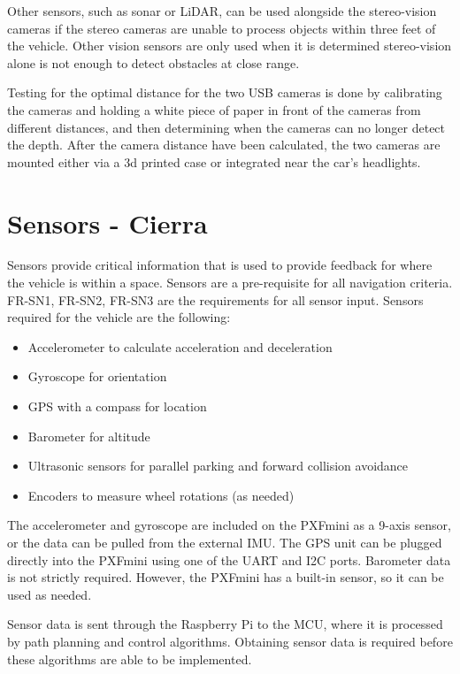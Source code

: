 \documentclass[compsoc,draftclsnofoot,onecolumn,10pt]{IEEEtran}
\begin{document}
Other sensors, such as sonar or LiDAR, can be used alongside the stereo-vision cameras if the stereo cameras are unable to process objects within three feet of the vehicle. Other vision sensors are only used when it is determined stereo-vision alone is not enough to detect obstacles at close range. \par
Testing for the optimal distance for the two USB cameras is done by calibrating the cameras and holding a white piece of paper in front of the cameras from different distances, and then determining when the cameras can no longer detect the depth. 
After the camera distance have been calculated, the two cameras are mounted either via a 3d printed case or integrated near the car's headlights. 

\section{Sensors - Cierra}
Sensors provide critical information that is used to provide feedback for where the vehicle is within a space. Sensors are a pre-requisite for all navigation criteria. FR-SN1, FR-SN2, FR-SN3 are the requirements for all sensor input. 
Sensors required for the vehicle are the following:
\begin{itemize}
\item Accelerometer to calculate acceleration and deceleration 
\item Gyroscope for orientation
\item GPS with a compass for location
\item Barometer for altitude 
\item Ultrasonic sensors for parallel parking and forward collision avoidance
\item Encoders to measure wheel rotations (as needed)
\end{itemize}

The accelerometer and gyroscope are included on the PXFmini as a 9-axis sensor, or the data can be pulled from the external IMU.  
The GPS unit can be plugged directly into the PXFmini using one of the UART and I2C ports. 
Barometer data is not strictly required. However, the PXFmini has a built-in sensor, so it can be used as needed.\par

Sensor data is sent through the Raspberry Pi to the MCU, where it is processed by path planning and control algorithms. Obtaining sensor data is required before these algorithms are able to be implemented. \par
\end{document}
